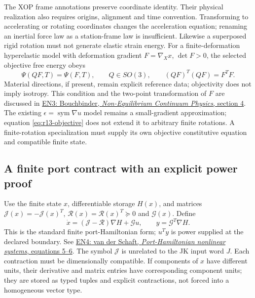 The XOP frame annotations preserve coordinate identity. Their physical
realization also requires origins, alignment and time convention. Transforming
to accelerating or rotating coordinates changes the acceleration equation;
renaming an inertial force law as a station-frame law is insufficient.
Likewise a superposed rigid rotation must not generate elastic strain energy.
For a finite-deformation hyperelastic model with deformation gradient
$F=\nabla_X x$, $\det F>0$, the selected objective free energy obeys
\begin{equation}
 \Psi(QF,T)=\Psi(F,T),\qquad Q\in SO(3),
 \qquad (QF)^T(QF)=F^TF .
 \label{eq:r13-objective}
\end{equation}
Material directions, if present, remain explicit reference data; objectivity
does not imply isotropy. This condition and the two-point transformation of
$F$ are discussed in
\href{https://www.weizmann.ac.il/chemphys/bouchbinder/sites/chemphys.bouchbinder/files/uploads/Courses/2019/Lectures/ContinuumPhysics_1-10_2019.pdf}
{EN3: Bouchbinder, \emph{Non-Equilibrium Continuum Physics}, section 4}.
The existing $\epsilon=\operatorname{sym}\nabla u$ model remains a small-gradient
approximation; equation \eqref{eq:r13-objective} does not extend it to arbitrary
finite rotations. A finite-rotation specialization must supply its own
objective constitutive equation and compatible finite state.

\subsection{A finite port contract with an explicit power proof}
Use the finite state $x$, differentiable storage $H(x)$, and matrices
$\mathcal J(x)=-\mathcal J(x)^T$, $\mathcal R(x)=\mathcal R(x)^T\succeq0$
and $\mathcal G(x)$. Define
\begin{equation}
 \dot x=(\mathcal J-\mathcal R)\nabla H+\mathcal G u,
 \qquad y=\mathcal G^T\nabla H .
 \label{eq:r13-port}
\end{equation}
This is the standard finite port-Hamiltonian form; $u^Ty$ is power supplied
at the declared boundary. See
\href{https://arxiv.org/html/2412.19673v1#S1.SS1}
{EN4: van der Schaft, \emph{Port-Hamiltonian nonlinear systems}, equations 5--6}.
The symbol $\mathcal J$ is unrelated to the JK input word $J$.
Each contraction must be dimensionally compatible. If components of $x$ have
different units, their derivative and matrix entries have corresponding
component units; they are stored as typed tuples and explicit contractions,
not forced into a homogeneous vector type.

